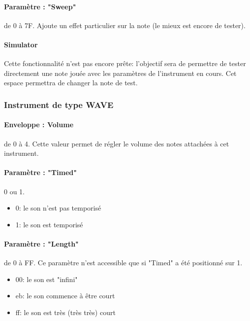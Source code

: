 \documentclass[12pt,a4paper]{article}
\begin{document}
            \paragraph{Paramètre : "Sweep"} de 0 à 7F. Ajoute un effet particulier sur la note (le mieux est encore de tester).

            \paragraph{Simulator} Cette fonctionnalité n'est pas encore prête: l'objectif sera de permettre de tester directement une note jouée avec les paramètres de l'instrument en cours. Cet espace permettra de changer la note de test.
        
        \subsubsection{Instrument de type WAVE}
        
        
        \paragraph{Enveloppe : Volume} de 0 à 4. Cette valeur permet de régler le volume des notes attachées à cet instrument. 
        
        \paragraph{Paramètre : "Timed"} 0 ou 1.
        \begin{itemize}
                \item{0: le son n'est pas temporisé}
                \item{1: le son est temporisé}
            \end{itemize} 
        
        \paragraph{Paramètre : "Length"} de 0 à FF. Ce paramètre n'est accessible que si "Timed" a été positionné sur 1.
        \begin{itemize}
                \item{00: le son est "infini"}
                \item{eb: le son commence à être court}
                \item{ff: le son est très (très très) court}
            \end{itemize}
        
\end{document}
